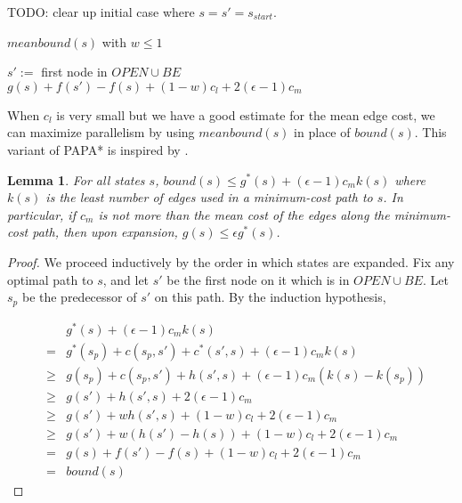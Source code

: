 \documentclass[letterpaper]{article}
\newtheorem{lemma}{Lemma}
\begin{document}
TODO: clear up initial case where $s = s' = s_{start}$.

\begin{algorithm}
\caption{$meanbound(s)$ with $w \le 1$}
\label{alg:bound}
\begin{algorithmic}
\STATE $s' :=$ first node in $OPEN \cup BE$
\RETURN $g(s) + f(s') - f(s) + (1-w) c_l + 2(\epsilon-1) c_m$
\end{algorithmic}
\end{algorithm}

When $c_l$ is very small but we have a good estimate for the mean edge cost, we can maximize parallelism by using $meanbound(s)$ in place of $bound(s)$. This variant of PAPA* is inspired by \cite{klein1997randomized}.

\begin{lemma}
\label{lem:mopt}
For all states $s$, $bound(s) \le g^*(s) + (\epsilon-1) c_m k(s)$ where $k(s)$ is the least number of edges used in a minimum-cost path to $s$. In particular, if $c_m$ is not more than the mean cost of the edges along the minimum-cost path, then upon expansion, $g(s) \le \epsilon g^*(s)$.
\end{lemma}

\begin{proof}
We proceed inductively by the order in which states are expanded. Fix any optimal path to $s$, and let $s'$ be the first node on it which is in $OPEN \cup BE$. Let $s_p$ be the predecessor of $s'$ on this path. By the induction hypothesis,

\begin{eqnarray*}
&&g^*(s) + (\epsilon-1) c_m k(s)
\\&=& g^*(s_p) + c(s_p,s') + c^*(s',s) + (\epsilon-1) c_m k(s)
\\&\ge& g(s_p) + c(s_p,s') + h(s',s) + (\epsilon-1) c_m (k(s) - k(s_p))
\\&\ge& g(s') + h(s',s) + 2(\epsilon-1) c_m
\\&\ge& g(s') + wh(s',s) + (1-w)c_l + 2(\epsilon-1) c_m
\\&\ge& g(s') + w(h(s') - h(s)) + (1-w)c_l + 2(\epsilon-1) c_m
\\&=& g(s) + f(s') - f(s) + (1-w)c_l + 2(\epsilon-1) c_m
\\&=& bound(s)
\end{eqnarray*}
\end{proof}



\end{document}
